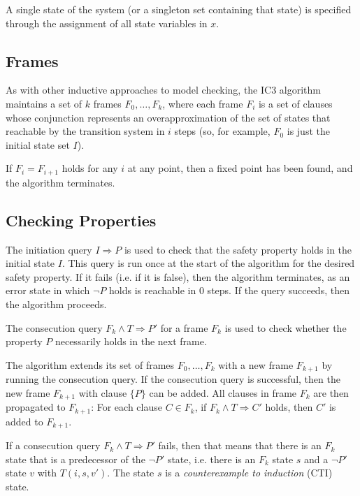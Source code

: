 \documentclass[12pt,a4paper,twoside,openright]{report}
\begin{document}
A single state of the system (or a singleton set containing that state) is
specified through the assignment
of all state variables in $x$.

\subsection{Frames}
As with other inductive approaches to model checking,
the IC3 algorithm maintains a set of $k$ frames $F_0,\ldots,F_k$, where
each frame $F_i$ is a set of clauses whose conjunction represents an
overapproximation of the set of states that reachable by the transition
system in $i$ steps
(so, for example, $F_0$ is just the initial state set $I$).

If $F_i = F_{i + 1}$ holds for any $i$ at any point, then a fixed point has
been found, and the algorithm terminates.

\subsection{Checking Properties}
The initiation query $I \Rightarrow P$ is used to check that the safety
property holds in the initial state $I$.
This query is run once at the start of
the algorithm for the desired safety property. If it fails (i.e. if it
is false), then the algorithm terminates, as an error state in
which $\neg P$ holds is reachable in 0 steps. If the query succeeds,
then the algorithm proceeds.

The consecution query $F_k \wedge T \Rightarrow P'$ for a frame $F_k$
is used to check whether the property $P$ necessarily holds in the next
frame.

The algorithm extends its set of frames $F_0,\ldots,F_k$ with a new frame
$F_{k + 1}$ by running the consecution query.
If the consecution query is successful, then the new frame $F_{k + 1}$
with clause $\{P\}$ can be added.
All clauses in frame $F_k$ are then propagated to $F_{k + 1}$:
For each clause $C \in F_k$, if $F_k \wedge T \Rightarrow C'$ holds, then $C'$
is added to $F_{k + 1}$.

If a consecution query $F_k \wedge T \Rightarrow P'$ fails, then that means that
there is an $F_k$ state that is a predecessor of the $\neg P'$ state,
i.e. there is an $F_k$ state $s$ and a $\neg P'$ state $v$ with $T(i,s,v')$.
The state
$s$ is a \emph{counterexample to induction} (CTI) state.
\end{document}
